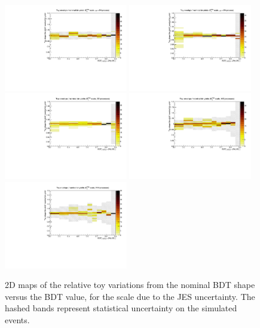 \begin{figure}[htbp]
\begin{center}
\includegraphics[width=0.48\textwidth]{figures/syst_BDT_ZH_hinv_sm_toyenvelope_MET.pdf}
\includegraphics[width=0.48\textwidth]{figures/syst_BDT_ggZH_hinv_toyenvelope_MET.pdf}
\includegraphics[width=0.48\textwidth]{figures/syst_BDT_ZZ_toyenvelope_MET.pdf}
\includegraphics[width=0.48\textwidth]{figures/syst_BDT_WZ_toyenvelope_MET.pdf}
\includegraphics[width=0.48\textwidth]{figures/syst_BDT_VVV_toyenvelope_MET.pdf}
\caption{2D maps of the relative toy variations from the nominal BDT shape versus the BDT value, for the \met scale due to the JES uncertainty. The hashed bands represent statistical uncertainty on the simulated events.}
\label{fig:bdt_toy_envelopes_MET}
\end{center}
\end{figure}

